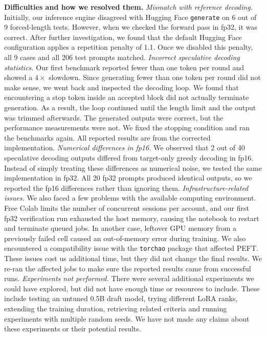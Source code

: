 \documentclass[conference]{IEEEtran}
\begin{document}
\textbf{Difficulties and how we resolved them.}
\emph{Mismatch with reference decoding.} Initially, our inference engine disagreed with Hugging Face \texttt{generate} on 6 out of 9 forced-length tests. However, when we checked the forward pass in fp32, it was correct. After further investigation, we found that the default Hugging Face configuration applies a repetition penalty of 1.1. Once we disabled this penalty, all 9 cases and all 206 test prompts matched.
\emph{Incorrect speculative decoding statistics.} Our first benchmark reported fewer than one token per round and showed a $4\times$ slowdown. Since generating fewer than one token per round did not make sense, we went back and inspected the decoding loop. We found that encountering a stop token inside an accepted block did not actually terminate generation. As a result, the loop continued until the length limit and the output was trimmed afterwards. The generated outputs were correct, but the performance measurements were not. We fixed the stopping condition and ran the benchmarks again. All reported results are from the corrected implementation.
\emph{Numerical differences in fp16.} We observed that 2 out of 40 speculative decoding outputs differed from target-only greedy decoding in fp16. Instead of simply treating these differences as numerical noise, we tested the same implementation in fp32. All 20 fp32 prompts produced identical outputs, so we reported the fp16 differences rather than ignoring them.
\emph{Infrastructure-related issues.} We also faced a few problems with the available computing environment. Free Colab limits the number of concurrent sessions per account, and our first fp32 verification run exhausted the host memory, causing the notebook to restart and terminate queued jobs. In another case, leftover GPU memory from a previously failed cell caused an out-of-memory error during training. We also encountered a compatibility issue with the \texttt{torchao} package that affected PEFT. These issues cost us additional time, but they did not change the final results. We re-ran the affected jobs to make sure the reported results came from successful runs.
\emph{Experiments not performed.} There were several additional experiments we could have explored, but did not have enough time or resources to include. These include testing an untuned 0.5B draft model, trying different LoRA ranks, extending the training duration, retrieving related criteria and running experiments with multiple random seeds. We have not made any claims about these experiments or their potential results.
\end{document}
